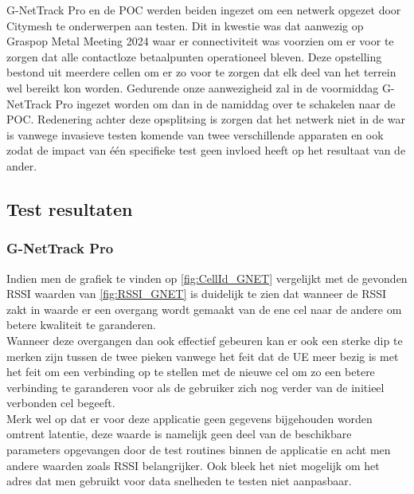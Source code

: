 G-NetTrack Pro en de POC werden beiden ingezet om een netwerk opgezet door Citymesh te onderwerpen aan testen. Dit in kwestie was dat aanwezig op Graspop Metal Meeting 2024 waar er connectiviteit was voorzien om er voor te zorgen dat alle contactloze betaalpunten operationeel bleven. Deze opstelling bestond uit meerdere cellen om er zo voor te zorgen dat elk deel van het terrein wel bereikt kon worden. Gedurende onze aanwezigheid zal in de voormiddag G-NetTrack Pro ingezet worden om dan in de namiddag over te schakelen naar de POC. Redenering achter deze opsplitsing is zorgen dat het netwerk niet in de war is vanwege invasieve testen komende van twee verschillende apparaten en ook zodat de impact van één specifieke test geen invloed heeft op het resultaat van de ander.

\subsection{Test resultaten}

\subsubsection{G-NetTrack Pro}

Indien men de grafiek te vinden op \ref{fig:CellId_GNET} vergelijkt met de gevonden RSSI waarden van \ref{fig:RSSI_GNET} is duidelijk te zien dat wanneer de RSSI zakt in waarde er een overgang wordt gemaakt van de ene cel naar de andere om betere kwaliteit te garanderen. \\

Wanneer deze overgangen dan ook effectief gebeuren kan er ook een sterke dip te merken zijn tussen de twee pieken vanwege het feit dat de UE meer bezig is met het feit om een verbinding op te stellen met de nieuwe cel om zo een betere verbinding te garanderen voor als de gebruiker zich nog verder van de initieel verbonden cel begeeft. \\

Merk wel op dat er voor deze applicatie geen gegevens bijgehouden worden omtrent latentie, deze waarde is namelijk geen deel van de beschikbare parameters opgevangen door de test routines binnen de applicatie en acht men andere waarden zoals RSSI belangrijker. Ook bleek het niet mogelijk om het adres dat men gebruikt voor data snelheden te testen niet aanpasbaar. 

